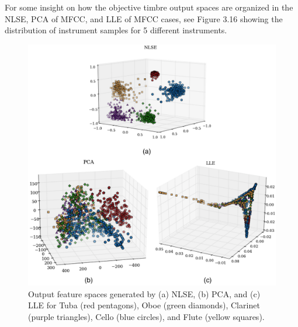 \documentclass[12pt]{report} 	%
\numberwithin{figure}{chapter}
\numberwithin{table}{chapter}
\numberwithin{equation}{chapter}
\begin{document}
\begin{flushleft}
For some insight on how the objective timbre output spaces are organized in the NLSE, PCA of MFCC, and LLE of MFCC cases, see Figure 3.16 showing the distribution of instrument samples for 5 different instruments.
\begin{figure}[h!]
\begin{center}
\includegraphics[width=\linewidth]{NLSECluster}
\caption[NLSE vs. PCA vs. LLE instrument clusters]{Output feature spaces generated by (a) NLSE, (b) PCA, and (c) LLE for Tuba (red pentagons), Oboe (green diamonds), Clarinet (purple triangles), Cello (blue circles), and Flute (yellow squares).}
\end{center}
\end{figure}


\end{flushleft}
\end{document}
